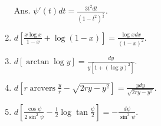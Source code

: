 \begin{enumerate}
Ans. $\psi'(t) dt = \frac{3 t^2 dt}{(1 - t^2)^{\frac{5}{2}}}$.

\item
$d \left [ \frac{x \log x}{1 - x} + \log(1 - x) \right ] = \frac{\log x dx}{(1 - x)^2}$.

\item
$d [ \arctan \log y] = \frac{dy}{y[1 + (\log y)^2]}$.

\item
$d \left [ r \operatorname{arcvers} \frac{y}{r} - \sqrt{2ry - y^2} \right ] 
= \frac{y dy}{\sqrt{2ry - y^2}}$.

\item
$d \left [ \frac{\cos \psi}{2 \sin^2 \psi} - \frac{1}{2} \log \tan \frac{\psi}{2} \right ] 
= -\frac{d\psi}{\sin^3 \psi}$.

\end{enumerate}

